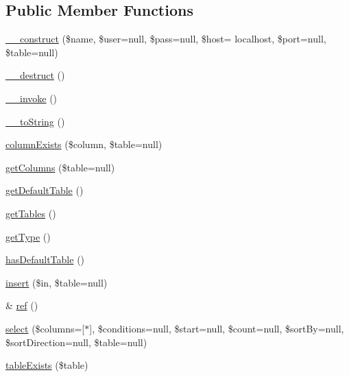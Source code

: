 \subsection*{Public Member Functions}
\begin{DoxyCompactItemize}
\item 
\hyperlink{class_postgre_s_q_l_database_a522739237db8d43369172cfe07bf7b85}{\+\_\+\+\_\+construct} (\$name, \$user=null, \$pass=null, \$host= \textquotesingle{}localhost\textquotesingle{}, \$port=null, \$table=null)
\item 
\hyperlink{class_postgre_s_q_l_database_a421831a265621325e1fdd19aace0c758}{\+\_\+\+\_\+destruct} ()
\item 
\hyperlink{class_postgre_s_q_l_database_a9aac7e1475efe923de4e19cc2511f092}{\+\_\+\+\_\+invoke} ()
\item 
\hyperlink{class_postgre_s_q_l_database_a7516ca30af0db3cdbf9a7739b48ce91d}{\+\_\+\+\_\+to\+String} ()
\item 
\hyperlink{class_postgre_s_q_l_database_a42c4cefdb183a7caa3115193a811d893}{column\+Exists} (\$column, \$table=null)
\item 
\hyperlink{class_postgre_s_q_l_database_a5cc0962e790b9ccffd2ca9c77cead320}{get\+Columns} (\$table=null)
\item 
\hyperlink{class_postgre_s_q_l_database_af54c3eed64c3e3dfb06a2541289ff0da}{get\+Default\+Table} ()
\item 
\hyperlink{class_postgre_s_q_l_database_a61b9097ace78236a1a7f9cfd9e9ab01c}{get\+Tables} ()
\item 
\hyperlink{class_postgre_s_q_l_database_a830b5c75df72b32396701bc563fbe3c7}{get\+Type} ()
\item 
\hyperlink{class_postgre_s_q_l_database_ad0aa1804fc79c22b46596db136320017}{has\+Default\+Table} ()
\item 
\hyperlink{class_postgre_s_q_l_database_a8e5626f114925dee9986c8edbfc3ec05}{insert} (\$in, \$table=null)
\item 
\& \hyperlink{class_postgre_s_q_l_database_ae6979f06c8e38dbe758ff53f7395531f}{ref} ()
\item 
\hyperlink{class_postgre_s_q_l_database_a1efc6b974510d4c668660f1abe184182}{select} (\$columns=\mbox{[}\textquotesingle{}$\ast$\textquotesingle{}\mbox{]}, \$conditions=null, \$start=null, \$count=null, \$sort\+By=null, \$sort\+Direction=null, \$table=null)
\item 
\hyperlink{class_postgre_s_q_l_database_ae7cdaa744d52a1eb0103e377023ca528}{table\+Exists} (\$table)
\end{DoxyCompactItemize}
